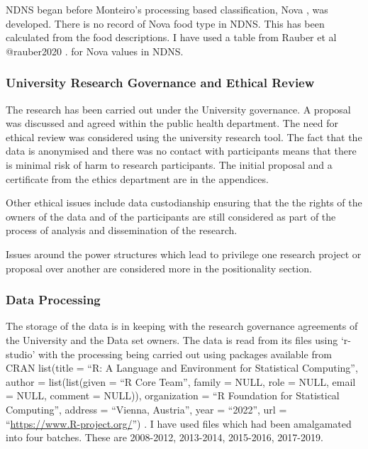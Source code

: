 \documentclass[
]{article}
\begin{document}
NDNS began before Monteiro's processing based classification, Nova , was
developed. There is no record of Nova food type in NDNS. This has been
calculated from the food descriptions. I have used a table from Rauber
et al @rauber2020 . for Nova values in NDNS.

\hypertarget{university-research-governance-and-ethical-review}{%
\subsubsection{University Research Governance and Ethical
Review}\label{university-research-governance-and-ethical-review}}

The research has been carried out under the University governance. A
proposal was discussed and agreed within the public health department.
The need for ethical review was considered using the university research
tool. The fact that the data is anonymised and there was no contact with
participants means that there is minimal risk of harm to research
participants. The initial proposal and a certificate from the ethics
department are in the appendices.

Other ethical issues include data custodianship ensuring that the the
rights of the owners of the data and of the participants are still
considered as part of the process of analysis and dissemination of the
research.

Issues around the power structures which lead to privilege one research
project or proposal over another are considered more in the
positionality section.

\hypertarget{data-processing}{%
\subsubsection{Data Processing}\label{data-processing}}

The storage of the data is in keeping with the research governance
agreements of the University and the Data set owners. The data is read
from its files using `r-studio' with the processing being carried out
using packages available from CRAN list(title = ``R: A Language and
Environment for Statistical Computing'', author = list(list(given = ``R
Core Team'', family = NULL, role = NULL, email = NULL, comment = NULL)),
organization = ``R Foundation for Statistical Computing'', address =
``Vienna, Austria'', year = ``2022'', url =
``\url{https://www.R-project.org/}'') . I have used files which had been
amalgamated into four batches. These are 2008-2012, 2013-2014,
2015-2016, 2017-2019.
\end{document}
